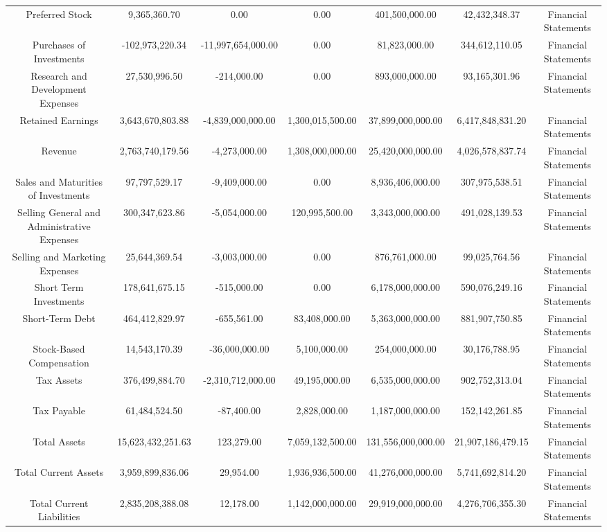\begin{longtable}{ccccccc}
Preferred Stock & 9,365,360.70 & 0.00 & 0.00 & 401,500,000.00 & 42,432,348.37 & Financial Statements \\
Purchases of Investments & -102,973,220.34 & -11,997,654,000.00 & 0.00 & 81,823,000.00 & 344,612,110.05 & Financial Statements \\
Research and Development Expenses & 27,530,996.50 & -214,000.00 & 0.00 & 893,000,000.00 & 93,165,301.96 & Financial Statements \\
Retained Earnings & 3,643,670,803.88 & -4,839,000,000.00 & 1,300,015,500.00 & 37,899,000,000.00 & 6,417,848,831.20 & Financial Statements \\
Revenue & 2,763,740,179.56 & -4,273,000.00 & 1,308,000,000.00 & 25,420,000,000.00 & 4,026,578,837.74 & Financial Statements \\
Sales and Maturities of Investments & 97,797,529.17 & -9,409,000.00 & 0.00 & 8,936,406,000.00 & 307,975,538.51 & Financial Statements \\
Selling General and Administrative Expenses & 300,347,623.86 & -5,054,000.00 & 120,995,500.00 & 3,343,000,000.00 & 491,028,139.53 & Financial Statements \\
Selling and Marketing Expenses & 25,644,369.54 & -3,003,000.00 & 0.00 & 876,761,000.00 & 99,025,764.56 & Financial Statements \\
Short Term Investments & 178,641,675.15 & -515,000.00 & 0.00 & 6,178,000,000.00 & 590,076,249.16 & Financial Statements \\
Short-Term Debt & 464,412,829.97 & -655,561.00 & 83,408,000.00 & 5,363,000,000.00 & 881,907,750.85 & Financial Statements \\
Stock-Based Compensation & 14,543,170.39 & -36,000,000.00 & 5,100,000.00 & 254,000,000.00 & 30,176,788.95 & Financial Statements \\
Tax Assets & 376,499,884.70 & -2,310,712,000.00 & 49,195,000.00 & 6,535,000,000.00 & 902,752,313.04 & Financial Statements \\
Tax Payable & 61,484,524.50 & -87,400.00 & 2,828,000.00 & 1,187,000,000.00 & 152,142,261.85 & Financial Statements \\
Total Assets & 15,623,432,251.63 & 123,279.00 & 7,059,132,500.00 & 131,556,000,000.00 & 21,907,186,479.15 & Financial Statements \\
Total Current Assets & 3,959,899,836.06 & 29,954.00 & 1,936,936,500.00 & 41,276,000,000.00 & 5,741,692,814.20 & Financial Statements \\
Total Current Liabilities & 2,835,208,388.08 & 12,178.00 & 1,142,000,000.00 & 29,919,000,000.00 & 4,276,706,355.30 & Financial Statements \\

\end{longtable}
